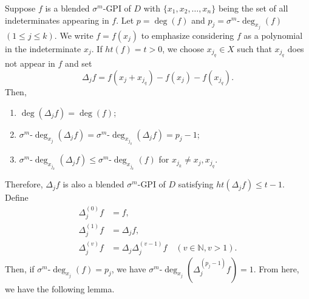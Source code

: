 \documentclass{cimart}
\begin{document}
Suppose $f$ is a blended $\sigma^m$-GPI of $D$ with $\{x_1,x_2,\dots,x_n\}$ being the set of all indeterminates appearing in $f$. Let $p = \deg(f)$ and $p_j = \sigma^m\text{-}\deg_{x_j}(f)$ $(1 \leq j \leq k)$. We write $f = f(x_j)$ to emphasize considering $f$ as a polynomial in the indeterminate $x_j$. If $ht(f) = t > 0$, we choose $x_{j_q} \in X$ such that $x_{j_q}$ does not appear in $f$ and set
\[
\Delta_jf = f(x_j + x_{j_q}) - f(x_j) - f(x_{j_q}).
\]
Then,
\begin{enumerate}
	\item $\deg(\Delta_jf) = \deg(f)$;
	\item $\sigma^m\text{-}\deg_{x_j}(\Delta_jf) = \sigma^m\text{-}\deg_{x_{j_q}}(\Delta_jf) = p_j - 1$;
	\item $\sigma^m\text{-}\deg_{x_{j_k}}(\Delta_jf) \leq \sigma^m\text{-}\deg_{x_{j_k}}(f)$ for $x_{j_k} \neq x_j,x_{j_q}$.
\end{enumerate}
Therefore, $\Delta_jf$ is also a blended $\sigma^m$-GPI of $D$ satisfying $ht(\Delta_jf) \leq t - 1$. Define
\[
\begin{aligned}
\Delta_j^{(0)}f &= f, \\
\Delta_j^{(1)}f &= \Delta_jf, \\
\Delta_j^{(v)}f &= \Delta_j\Delta_j^{(v-1)}f \quad (v \in \mathbb{N}, v > 1).
\end{aligned}
\]
Then, if $\sigma^m\text{-}\deg_{x_j}(f) = p_j$, we have $\sigma^m\text{-}\deg_{x_j}(\Delta_j^{(p_j-1)}f) = 1$. From here, we have the following lemma.
\end{document}

